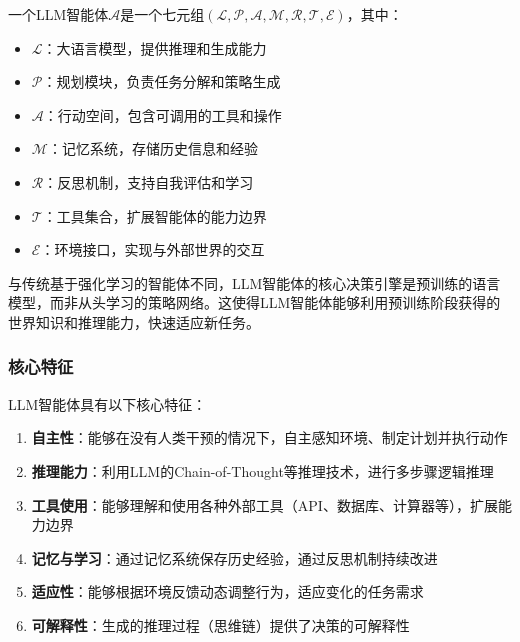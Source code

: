 \begin{definition}[LLM智能体]\label{def:llm_agent}
一个LLM智能体$\mathcal{A}$是一个七元组$(\mathcal{L}, \mathcal{P}, \mathcal{A}, \mathcal{M}, \mathcal{R}, \mathcal{T}, \mathcal{E})$，其中：
\begin{itemize}
    \item $\mathcal{L}$：大语言模型，提供推理和生成能力
    \item $\mathcal{P}$：规划模块，负责任务分解和策略生成
    \item $\mathcal{A}$：行动空间，包含可调用的工具和操作
    \item $\mathcal{M}$：记忆系统，存储历史信息和经验
    \item $\mathcal{R}$：反思机制，支持自我评估和学习
    \item $\mathcal{T}$：工具集合，扩展智能体的能力边界
    \item $\mathcal{E}$：环境接口，实现与外部世界的交互
\end{itemize}
\end{definition}

与传统基于强化学习的智能体不同，LLM智能体的核心决策引擎是预训练的语言模型，而非从头学习的策略网络。这使得LLM智能体能够利用预训练阶段获得的世界知识和推理能力，快速适应新任务。

\subsubsection{核心特征}

LLM智能体具有以下核心特征：

\begin{enumerate}[leftmargin=2em]
    \item \textbf{自主性}：能够在没有人类干预的情况下，自主感知环境、制定计划并执行动作
    
    \item \textbf{推理能力}：利用LLM的Chain-of-Thought等推理技术，进行多步骤逻辑推理
    
    \item \textbf{工具使用}：能够理解和使用各种外部工具（API、数据库、计算器等），扩展能力边界
    
    \item \textbf{记忆与学习}：通过记忆系统保存历史经验，通过反思机制持续改进
    
    \item \textbf{适应性}：能够根据环境反馈动态调整行为，适应变化的任务需求
    
    \item \textbf{可解释性}：生成的推理过程（思维链）提供了决策的可解释性
\end{enumerate}

